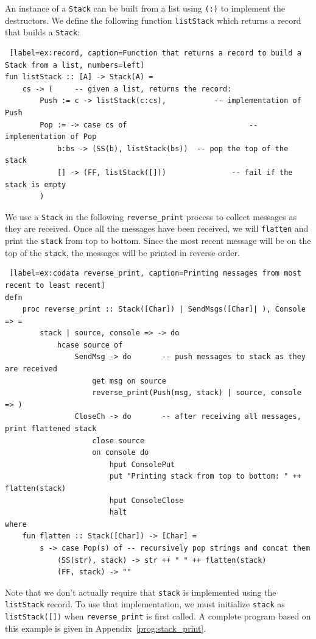 \documentclass[11pt]{article}
\begin{document}
An instance of a \lstinline{Stack} can be built from a list using \lstinline{(:)} to implement the destructors.
We define the following function \lstinline$listStack$ which returns a record that builds a \lstinline{Stack}:
\begin{lstlisting} [label=ex:record, caption=Function that returns a record to build a Stack from a list, numbers=left]
fun listStack :: [A] -> Stack(A) = 
	cs -> (		-- given a list, returns the record:
		Push := c -> listStack(c:cs),			-- implementation of Push
		Pop := -> case cs of							-- implementation of Pop
			b:bs -> (SS(b), listStack(bs))	-- pop the top of the stack
			[] -> (FF, listStack([]))				-- fail if the stack is empty
		)
\end{lstlisting} 

We use a \lstinline{Stack} in the following \lstinline$reverse_print$ process to collect messages as they are received.
Once all the messages have been received, we will \lstinline$flatten$ and print the \lstinline$stack$ from top to bottom.
Since the most recent message will be on the top of the \lstinline$stack$, the messages will be printed in reverse order.
\begin{lstlisting} [label=ex:codata reverse_print, caption=Printing messages from most recent to least recent]
defn        
	proc reverse_print :: Stack([Char]) | SendMsgs([Char]| ), Console => =
		stack | source, console => -> do
			hcase source of
				SendMsg -> do		-- push messages to stack as they are received
					get msg on source
					reverse_print(Push(msg, stack) | source, console => )
				CloseCh -> do		-- after receiving all messages, print flattened stack
					close source
					on console do
						hput ConsolePut
						put "Printing stack from top to bottom: " ++ flatten(stack)
						hput ConsoleClose
						halt
where
	fun flatten :: Stack([Char]) -> [Char] =
		s -> case Pop(s) of	-- recursively pop strings and concat them
			(SS(str), stack) -> str ++ " " ++ flatten(stack)
			(FF, stack) -> ""
\end{lstlisting}
Note that we don't actually require that \lstinline$stack$ is implemented using the \lstinline$listStack$ record.
To use that implementation, we must initialize \lstinline$stack$ as \lstinline{listStack([])} when \lstinline$reverse_print$ is first called.
A complete program based on this example is given in Appendix~\ref{prog:stack_print}.
\end{document}
